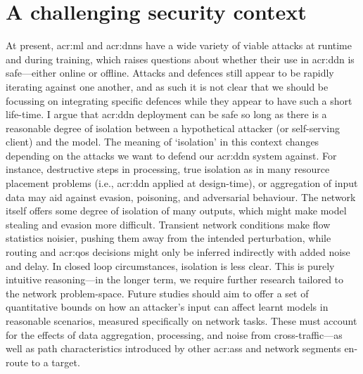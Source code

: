 \section{A challenging security context}
At present, \gls{acr:ml} and \glspl{acr:dnn} have a wide variety of viable attacks at runtime and during training, which raises questions about whether their use in \gls{acr:ddn} is safe---either online or offline.
Attacks and defences still appear to be rapidly iterating against one another, and as such it is not clear that we should be focussing on integrating specific defences while they appear to have such a short life-time.
I argue that \gls{acr:ddn} deployment can be safe so long as there is a reasonable degree of isolation between a hypothetical attacker (or self-serving client) and the model.
The meaning of `isolation' in this context changes depending on the attacks we want to defend our \gls{acr:ddn} system against.
For instance, destructive steps in processing, true isolation as in many resource placement problems (i.e., \gls{acr:ddn} applied at design-time), or aggregation of input data may aid against evasion, poisoning, and adversarial behaviour.
The network itself offers some degree of isolation of many outputs, which might make model stealing and evasion more difficult.
Transient network conditions make flow statistics noisier, pushing them away from the intended perturbation, while routing and \gls{acr:qos} decisions might only be inferred indirectly with added noise and delay.
In closed loop circumstances, isolation is less clear.
This is purely intuitive reasoning---in the longer term, we require further research tailored to the network problem-space.
Future studies should aim to offer a set of quantitative bounds on how an attacker's input can affect learnt models in reasonable scenarios, measured specifically on network tasks.
These must account for the effects of data aggregation, processing, and noise from cross-traffic---as well as path characteristics introduced by other \glspl{acr:as} and network segments en-route to a target.

